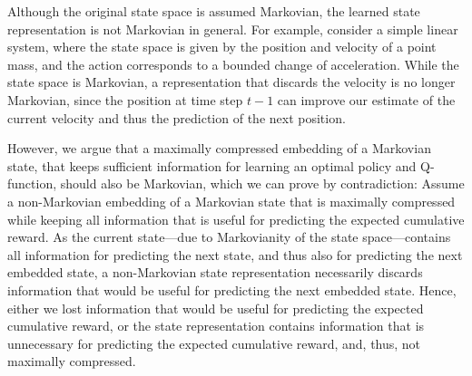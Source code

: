 \documentclass[a4paper,12pt]{article}
\begin{document}
Although the original state space is assumed Markovian, the learned state representation is not Markovian in general. For example, consider a simple linear system, where the state space is given by the position and velocity of a point mass, and the action corresponds to a bounded change of acceleration. While the state space is Markovian, a representation that discards the velocity is no longer Markovian, since the position at time step $t-1$ can improve our estimate of the current velocity and thus the prediction of the next position. 

However, we argue that a maximally compressed embedding of a Markovian state, that keeps sufficient information for learning an optimal policy and Q-function, should also be Markovian, which we can prove by contradiction: Assume a non-Markovian embedding of a Markovian state that is maximally compressed while keeping all information that is useful for predicting the expected cumulative reward. As the current state---due to Markovianity of the state space---contains all information for predicting the next state, and thus also for predicting the next embedded state, a non-Markovian state representation necessarily discards information that would be useful for predicting the next embedded state. Hence, either we lost information that would be useful for predicting the expected cumulative reward, or the state representation contains information that is unnecessary for predicting the expected cumulative reward, and, thus, not maximally compressed.

\end{document}
